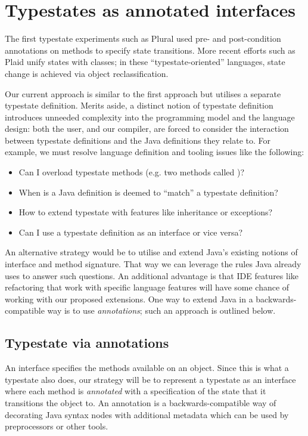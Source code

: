 \section{Typestates as annotated interfaces}

The first typestate experiments such as Plural \cite{bierhoff11} used
pre- and post-condition annotations on methods to specify state
transitions. More recent efforts such as Plaid \cite{garcia14} unify
states with classes; in these ``typestate-oriented'' languages, state
change is achieved via object reclassification.

Our current approach is similar to the first approach but utilises a
separate typestate definition. Merits aside, a distinct notion of
typestate definition introduces unneeded complexity into the
programming model and the language design: both the user, and our
compiler, are forced to consider the interaction between typestate
definitions and the Java definitions they relate to. For example, we
must resolve language definition and tooling issues like the
following:

\begin{itemize}
\item Can I overload typestate methods (e.g. two methods
  called )?
\item When is a Java definition is deemed to ``match'' a typestate
  definition?
\item How to extend typestate with features like inheritance or exceptions?
\item Can I use a typestate definition as an interface or vice versa?
\end{itemize}

\noindent An alternative strategy would be to utilise and extend
Java's existing notions of interface and method signature. That way we
can leverage the rules Java already uses to answer such questions. An
additional advantage is that IDE features like refactoring that work
with specific language features will have some chance of working with
our proposed extensions. One way to extend Java in a
backwards-compatible way is to use \emph{annotations}; such an
approach is outlined below.

\subsection{Typestate via annotations}

An interface specifies the methods available on an object. Since this
is what a typestate also does, our strategy will be to represent a
typestate as an interface where each method is \emph{annotated} with a
specification of the state that it transitions the object to. An
annotation is a backwards-compatible way of decorating Java syntax
nodes with additional metadata which can be used by preprocessors or
other tools.

